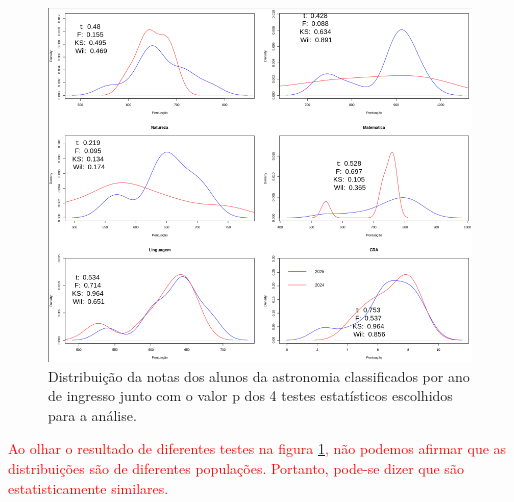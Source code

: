 \begin{figure}[h]
    \centering
    \includegraphics[width=1\linewidth]{Figuras/grades.png}
    \caption{Distribuição da notas dos alunos da astronomia classificados por ano de ingresso junto com o valor p dos 4 testes estatísticos escolhidos para a análise.}
    \label{grades}
\end{figure}

\vspace{8em}

\textcolor{red}{Ao olhar o resultado de diferentes testes na figura \ref{grades}, não podemos afirmar que as distribuições são de diferentes populações. Portanto, pode-se dizer que são estatisticamente similares.}
